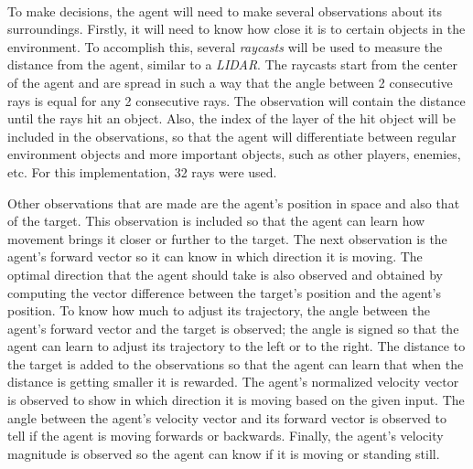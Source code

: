 \paragraph{}
To make decisions, the agent will need to make several observations about its surroundings. Firstly, it will need to know how close it is to certain objects in the environment. To accomplish this, several \emph{raycasts} will be used to measure the distance from the agent, similar to a \emph{LIDAR}. The raycasts start from the center of the agent and are spread in such a way that the angle between 2 consecutive rays is equal for any 2 consecutive rays. The observation will contain the distance until the rays hit an object. Also, the index of the layer of the hit object will be included in the observations, so that the agent will differentiate between regular environment objects and more important objects, such as other players, enemies, etc. For this implementation, 32 rays were used.

Other observations that are made are the agent's position in space and also that of the target. This observation is included so that the agent can learn how movement brings it closer or further to the target. The next observation is the agent's forward vector so it can know in which direction it is moving. The optimal direction that the agent should take is also observed and obtained by computing the vector difference between the target's position and the agent's position. To know how much to adjust its trajectory, the angle between the agent's forward vector and the target is observed; the angle is signed so that the agent can learn to adjust its trajectory to the left or to the right. The distance to the target is added to the observations so that the agent can learn that when the distance is getting smaller it is rewarded. The agent's normalized velocity vector is observed to show in which direction it is moving based on the given input. The angle between the agent's velocity vector and its forward vector is observed to tell if the agent is moving forwards or backwards. Finally, the agent's velocity magnitude is observed so the agent can know if it is moving or standing still. 

